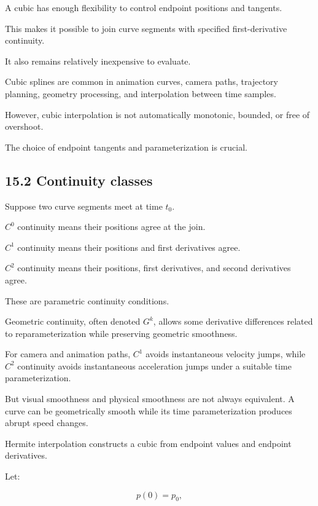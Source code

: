 \hypertarget{02-foundations-ii-ch028-why-cubics-are-so-useful}{}

A cubic has enough flexibility to control endpoint positions and tangents.

This makes it possible to join curve segments with specified first-derivative continuity.

It also remains relatively inexpensive to evaluate.

Cubic splines are common in animation curves, camera paths, trajectory planning, geometry processing, and interpolation between time samples.

However, cubic interpolation is not automatically monotonic, bounded, or free of overshoot.

The choice of endpoint tangents and parameterization is crucial.

\subsection{15.2 Continuity classes}\label{02-foundations-ii-ch028-continuity-classes}

\hypertarget{02-foundations-ii-ch028-continuity-classes}{}

Suppose two curve segments meet at time \(t_0\).

\(C^0\) continuity means their positions agree at the join.

\(C^1\) continuity means their positions and first derivatives agree.

\(C^2\) continuity means their positions, first derivatives, and second derivatives agree.

These are parametric continuity conditions.

Geometric continuity, often denoted \(G^k\), allows some derivative differences related to reparameterization while preserving geometric smoothness.

For camera and animation paths, \(C^1\) avoids instantaneous velocity jumps, while \(C^2\) continuity avoids instantaneous acceleration jumps under a suitable time parameterization.

But visual smoothness and physical smoothness are not always equivalent. A curve can be geometrically smooth while its time parameterization produces abrupt speed changes.

Hermite interpolation constructs a cubic from endpoint values and endpoint derivatives.

Let:

\[ p(0)=p_0, \]

